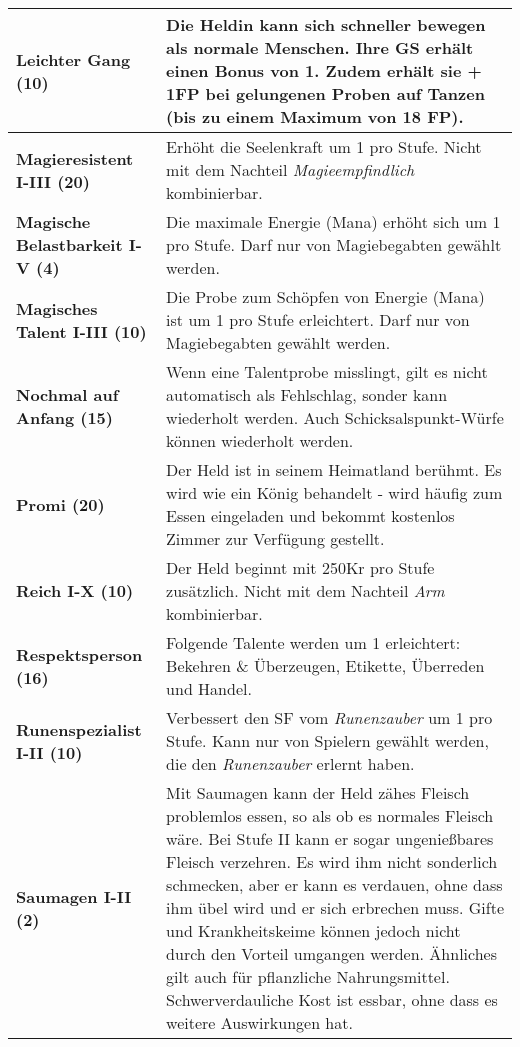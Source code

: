 \begin{longtable}{|p{5cm}|p{11cm}|}
\textbf{Leichter Gang (10)} & Die Heldin kann sich schneller bewegen als normale Menschen. Ihre GS erhält einen Bonus von 1. Zudem erhält sie + 1FP bei gelungenen Proben auf Tanzen (bis zu einem Maximum von 18 FP). \\ \hline

\textbf{Magieresistent I-III (20)} & Erhöht die Seelenkraft um 1 pro Stufe. Nicht mit dem Nachteil \textit{Magieempfindlich} kombinierbar. \\ \hline

\textbf{Magische Belastbarkeit I-V (4)} & Die maximale Energie (Mana) erhöht sich um 1 pro Stufe. Darf nur von Magiebegabten gewählt werden. \\ \hline

\textbf{Magisches Talent I-III (10)} & Die Probe zum Schöpfen von Energie (Mana) ist um 1 pro Stufe erleichtert. Darf nur von Magiebegabten gewählt werden. \\ \hline 

\textbf{Nochmal auf Anfang (15)} & Wenn eine Talentprobe misslingt, gilt es nicht automatisch als Fehlschlag, sonder kann wiederholt werden. Auch Schicksalspunkt-Würfe können wiederholt werden. \\ \hline

\textbf{Promi (20)} & Der Held ist in seinem Heimatland berühmt. Es wird wie ein König behandelt - wird häufig zum Essen eingeladen und bekommt kostenlos Zimmer zur Verfügung gestellt. \\ \hline

\textbf{Reich I-X (10)} & Der Held beginnt mit 250Kr pro Stufe zusätzlich. Nicht mit dem Nachteil \textit{Arm} kombinierbar. \\ \hline

\textbf{Respektsperson (16)} & Folgende Talente werden um 1 erleichtert: Bekehren \& Überzeugen, Etikette, Überreden und Handel. \\ \hline

\textbf{Runenspezialist I-II (10)} & Verbessert den SF vom \textit{Runenzauber} um 1 pro Stufe. Kann nur von Spielern gewählt werden, die den \textit{Runenzauber} erlernt haben. \\ \hline

\textbf{Saumagen I-II (2)} & Mit Saumagen kann der Held zähes Fleisch problemlos essen, so als ob es normales Fleisch wäre. Bei Stufe II kann er sogar ungenießbares Fleisch verzehren. Es wird ihm nicht sonderlich schmecken, aber er kann es verdauen, ohne dass ihm übel wird und er sich erbrechen muss. Gifte und Krankheitskeime können jedoch nicht durch den Vorteil umgangen werden. Ähnliches gilt auch für pflanzliche Nahrungsmittel. Schwerverdauliche Kost ist essbar, ohne dass es weitere Auswirkungen hat. \\ \hline


\end{longtable}
